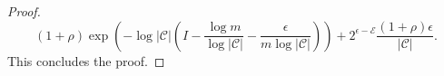 \begin{proof}
\begin{equation} \left(1 + \rho\right)\exp\left(-\log\left|\mathcal{C}\right|\left(I - \frac{\log m}{\log \left|\mathcal{C}\right|} -  \frac{\epsilon}{m\log \left|\mathcal{C}\right|}\right)\right) + 2^{\epsilon - \mathcal{E}}\frac{\left(1 + \rho\right)\epsilon}{\left|\mathcal{C}\right|}.
\end{equation}
This concludes the proof.
%
%
%
%
%
%
%

\end{proof}
